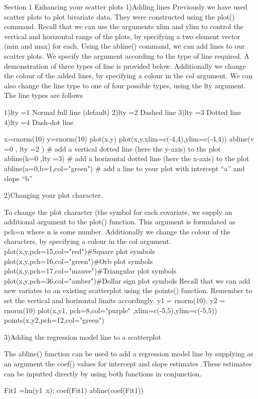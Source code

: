 Section 1 Enhancing your scatter plots
1)Adding lines
Previously we have used scatter plots to plot bivariate data. They were constructed using the plot() command.  
Recall that we can use the arguments xlim and ylim to control the vertical and horizontal range of the plots, by specifying a two element vector (min and max) for each.
Using the abline() command, we can add lines to our scatter plots. We specify the argument according to the type of line required. A demonstration of three types of line is provided below.
Additionally we change the colour of the added lines, by specifying a colour in the col argument. We can also change the line type to one of four possible types, using the lty argument.
The line types are follows
 
1)lty =1   Normal full line (default)
2)lty =2   Dashed line 
3)lty =3   Dotted line
4)lty =4   Dash-dot line
 
x=rnorm(10)
y=rnorm(10)
plot(x,y)
plot(x,y,xlim=c(-4,4),ylim=c(-4,4))
abline(v =0 , lty =2 )    # add a vertical dotted line (here the y-axis) to the plot
abline(h=0  ,lty =3)    # add a horizontal dotted line (here the x-axis) to the plot
abline(a=0,b=1,col="green") # add a line to your plot with intercept “a” and slope “b”

2)Changing your plot character.

To change the plot character (the symbol for each covariate, we supply an additional argument to the plot() function.  This argument is formulated as pch=n where n is some number.
Additionally we change the colour of the characters, by specifying a colour in the col argument.
plot(x,y,pch=15,col="red")#Square plot symbols
plot(x,y,pch=16,col="green")#Orb plot symbols
plot(x,y,pch=17,col="mauve")#Triangular plot symbols
plot(x,y,pch=36,col="amber")#Dollar sign plot symbols
Recall that we can add new variates to an existing scatterplot using the points() function. Remember to set the vertical and horizontal limits accordingly.
y1 = rnorm(10); y2 = rnorm(10)
plot(x,y1, pch=8,col="purple" ,xlim=c(-5,5),ylim=c(-5,5))
points(x,y2,pch=12,col="green")

3)Adding the regression model line to a scatterplot

The abline() function can be used to add a regression model line  by supplying as an argument the coef() values for intercept and slope estimates .These estimates can be inputted directly by using both functions in conjunction.

Fit1 =lm(y1~x);  coef(Fit1)
abline(coef(Fit1))



